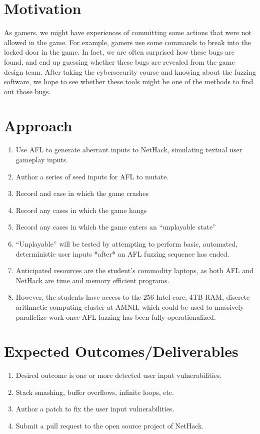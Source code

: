 \documentclass[12pt]{diazessay}
\begin{document}
\clearpage


\section*{Motivation}

As gamers, we might have experiences of committing some actions that were not allowed in the game.
For example, gamers use some commands to break into the locked door in the game.
In fact, we are often surprised how these bugs are found, and end up guessing whether these bugs are revealed from the game design team.
After taking the cybersecurity course and knowing about the fuzzing software, we hope to see whether these tools might be one of the methods to find out those bugs.


\section*{Approach}

\begin{enumerate}
  \item Use AFL to generate aberrant inputs to NetHack, simulating textual user gameplay inputs.
  \item Author a series of seed inputs for AFL to mutate.
  \item Record and case in which the game crashes
  \item Record any cases in which the game hangs
  \item Record any cases in which the game enters an “unplayable state”
  \item “Unplayable” will be tested by attempting to perform basic, automated, deterministic user inputs *after* an AFL fuzzing sequence has ended.
  \item Anticipated resources are the student’s commodity laptops, as both AFL and NetHack are time and memory efficient programs.
  \item However, the students have access to the 256 Intel core, 4TB RAM, discrete arithmetic computing cluster at AMNH, which could be used to massively parallelize work once AFL fuzzing has been fully operationalized.
\end{enumerate}


\section*{Expected Outcomes/Deliverables}

\begin{enumerate}
  \item Desired outcome is one or more detected user input vulnerabilities.
  \item Stack smashing, buffer overflows, infinite loops, etc.
  \item Author a patch to fix the user input vulnerabilities.
  \item Submit a pull request to the open source project of NetHack.
\end{enumerate}
\end{document}
